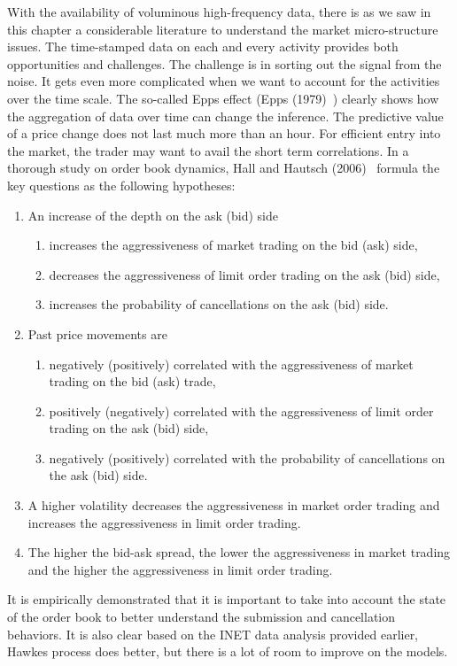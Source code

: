 With the availability of voluminous high-frequency data, there is as we saw in this chapter a considerable literature to understand the market micro-structure issues. The time-stamped data on each and every activity provides both opportunities and challenges. The challenge is in sorting out the signal from the noise. It gets even more complicated when we want to account for the activities over the time scale. The so-called Epps effect (Epps (1979)~\cite{epps79}) clearly shows how the aggregation of data over time can change the inference. The predictive value of a price change does not last much more than an hour. For efficient entry into the market, the trader may want to avail the short term correlations. In a thorough study on order book dynamics, Hall and Hautsch (2006)~\cite{hallhautsch06} formula the key questions as the following hypotheses:
	\begin{enumerate}[(1)]
	\item An increase of the depth on the ask (bid) side
		\begin{enumerate}[--]
		\item increases the aggressiveness of market trading on the bid (ask) side,
		\item decreases the aggressiveness of limit order trading on the ask (bid) side,
		\item increases the probability of cancellations on the ask (bid) side.
		\end{enumerate}
	\item Past price movements are
		\begin{enumerate}[--]
		\item negatively (positively) correlated with the aggressiveness of market trading on the bid (ask) trade,
		\item positively (negatively) correlated with the aggressiveness of limit order trading on the ask (bid) side,
		\item negatively (positively) correlated with the probability of cancellations on the ask (bid) side.
		\end{enumerate}
	\item A higher volatility decreases the aggressiveness in market order trading and increases the aggressiveness in limit order trading.
	\item The higher the bid-ask spread, the lower the aggressiveness in market trading and the higher the aggressiveness in limit order trading. 
	\end{enumerate}
It is empirically demonstrated that it is important to take into account the state of the order book to better understand the submission and cancellation behaviors. It is also clear based on the INET data analysis provided earlier, Hawkes process does better, but there is a lot of room to improve on the models.


